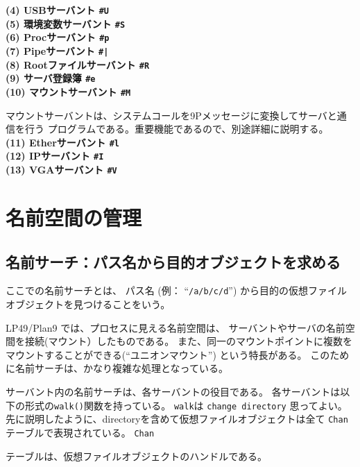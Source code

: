 {{\bf\flushleft (4) USBサーバント \verb|#U|}
\\

{\bf\flushleft (5) 環境変数サーバント \verb|#S|}
\\

{\bf\flushleft (6) Procサーバント \verb|#p|}
\\

{\bf\flushleft (7) Pipeサーバント \verb$#|$}
\\

{\bf\flushleft (8) Rootファイルサーバント \verb|#R|}
\\

{\bf\flushleft (9) サーバ登録簿 \verb|#e|}
\\

{\bf\flushleft (10) マウントサーバント \verb|#M|}

マウントサーバントは、システムコールを9Pメッセージに変換してサーバと通信を行う
プログラムである。重要機能であるので、別途詳細に説明する。
\\

{\bf\flushleft (11) Etherサーバント \verb|#l|}
\\

{\bf\flushleft (12) IPサーバント \verb|#I|}
\\

{\bf\flushleft (13) VGAサーバント \verb|#V|}
\\






\chapter{名前空間の管理}


\section{名前サーチ：パス名から目的オブジェクトを求める}


ここでの名前サーチとは、
パス名 (例： ``{\tt /a/b/c/d}'') から目的の仮想ファイルオブジェクトを見つけることをいう。

LP49/Plan9 では、プロセスに見える名前空間は、
サーバントやサーバの名前空間を接続(マウント）したものである。
また、同一のマウントポイントに複数をマウントすることができる(``ユニオンマウント'')
という特長がある。
このために名前サーチは、かなり複雑な処理となっている。

サーバント内の名前サーチは、各サーバントの役目である。
各サーバントは以下の形式の{\tt walk()}関数を持っている。
{\tt walk}は {\tt change directory} 思ってよい。　
先に説明したように、directoryを含めて仮想ファイルオブジェクトは全て
{\tt Chan}テーブルで表現されている。
\tt Chan}テーブルは、仮想ファイルオブジェクトのハンドルである。

